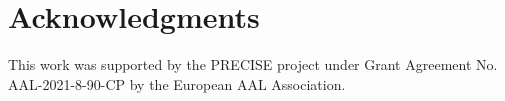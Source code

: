 \documentclass[letterpaper]{article} %
\begin{document}
\section{Acknowledgments}
This work was supported by the PRECISE project under Grant Agreement No. AAL-2021-8-90-CP by the European AAL Association.


\end{document}
